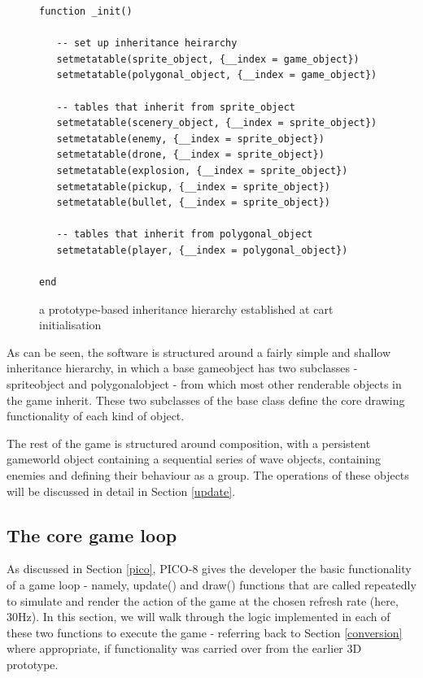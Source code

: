 \documentclass[11pt]{article}
\begin{document}
\begin{figure}[h]
   \begin{lstlisting}
function _init()

   -- set up inheritance heirarchy
   setmetatable(sprite_object, {__index = game_object})
   setmetatable(polygonal_object, {__index = game_object})

   -- tables that inherit from sprite_object
   setmetatable(scenery_object, {__index = sprite_object})
   setmetatable(enemy, {__index = sprite_object})
   setmetatable(drone, {__index = sprite_object})
   setmetatable(explosion, {__index = sprite_object})
   setmetatable(pickup, {__index = sprite_object})
   setmetatable(bullet, {__index = sprite_object})

   -- tables that inherit from polygonal_object
   setmetatable(player, {__index = polygonal_object})

end
   \end{lstlisting}
   \caption{a prototype-based inheritance hierarchy established at cart initialisation}
   \label{fig:codeinheritance}
\end{figure}

As can be seen, the software is structured around a fairly simple and shallow inheritance hierarchy,
in which a base game\textunderscore object has two subclasses - sprite\textunderscore object and
polygonal\textunderscore object - from which most other renderable objects in the game inherit.
These two subclasses of the base class define the core drawing functionality of each kind of object.

The rest of the game is structured around composition, with a persistent game\textunderscore world object
containing a sequential series of wave objects, containing enemies and defining their behaviour as a group.
The operations of these objects will be discussed in detail in Section \ref{update}.

\subsection{The core game loop}
As discussed in Section \ref{pico}, PICO-8 gives the developer the basic functionality
of a game loop - namely, \textunderscore update() and \textunderscore draw() functions that
are called repeatedly to
simulate and render the action of the game at the chosen refresh rate (here, 30Hz).
In this section, we will walk through the logic implemented in each of these two functions
to execute the game - referring back to Section \ref{conversion} where appropriate, if
functionality was carried over from the earlier 3D prototype.
\end{document}
